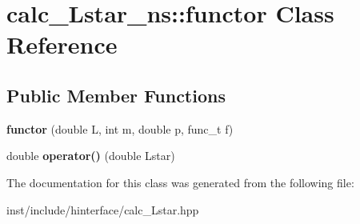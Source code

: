 \hypertarget{classcalc___lstar__ns_1_1functor}{}\section{calc\+\_\+\+Lstar\+\_\+ns\+:\+:functor Class Reference}
\label{classcalc___lstar__ns_1_1functor}
\subsection*{Public Member Functions}
\begin{DoxyCompactItemize}
\item 
{\bfseries functor} (double L, int m, double p, func\+\_\+t f)\hypertarget{classcalc___lstar__ns_1_1functor_a2a12f339c7b61256cb5074ae5dcbe432}{}\label{classcalc___lstar__ns_1_1functor_a2a12f339c7b61256cb5074ae5dcbe432}

\item 
double {\bfseries operator()} (double Lstar)\hypertarget{classcalc___lstar__ns_1_1functor_a18622333dbfc4e78025ed536932f9eac}{}\label{classcalc___lstar__ns_1_1functor_a18622333dbfc4e78025ed536932f9eac}

\end{DoxyCompactItemize}


The documentation for this class was generated from the following file\+:\begin{DoxyCompactItemize}
\item 
inst/include/hinterface/calc\+\_\+\+Lstar.\+hpp\end{DoxyCompactItemize}
